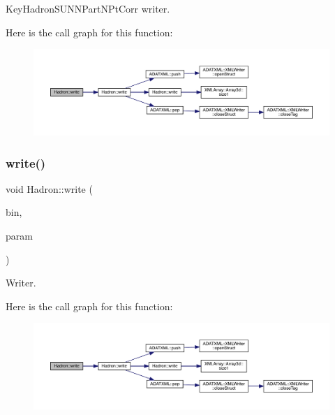 Key\+Hadron\+S\+U\+N\+N\+Part\+N\+Pt\+Corr writer. 

Here is the call graph for this function\+:
\nopagebreak
\begin{figure}[H]
\begin{center}
\leavevmode
\includegraphics[width=350pt]{d1/daf/namespaceHadron_a767bdf4c228c06edad1c47918ec75ed3_cgraph}
\end{center}
\end{figure}
\mbox{\label{namespaceHadron_a7b503b82bc88cdec19d5b7173957b35e}} 
\subsubsection{\texorpdfstring{write()}{write()}\hspace{0.1cm}{\footnotesize\ttfamily [56/95]}}
{\footnotesize\ttfamily void Hadron\+::write (\begin{DoxyParamCaption}\item[{\mbox{\hyperlink{classADATIO_1_1BinaryWriter}{Binary\+Writer}} \&}]{bin,  }\item[{const \mbox{\hyperlink{structHadron_1_1ValTimeSlice__t}{Val\+Time\+Slice\+\_\+t}} \&}]{param }\end{DoxyParamCaption})}



Writer. 

Here is the call graph for this function\+:
\nopagebreak
\begin{figure}[H]
\begin{center}
\leavevmode
\includegraphics[width=350pt]{d1/daf/namespaceHadron_a7b503b82bc88cdec19d5b7173957b35e_cgraph}
\end{center}
\end{figure}
\mbox{\label{namespaceHadron_a835e4515b6f5e491ce57ac5169196d90}} 
